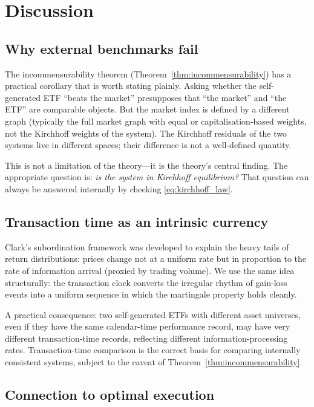 \documentclass[twocolumn,11pt,a4paper]{article}
\theoremstyle{plain}
\theoremstyle{definition}
\theoremstyle{remark}
\begin{document}
\section{Discussion}
\label{sec:discussion}

\subsection{Why external benchmarks fail}
\label{sec:discussion_benchmarks}

The incommensurability theorem (Theorem~\ref{thm:incommensurability})
has a practical corollary that is worth stating plainly.  Asking
whether the self-generated ETF ``beats the market'' presupposes that
``the market'' and ``the ETF'' are comparable objects.  But the market
index is defined by a different graph (typically the full market graph
with equal or capitalisation-based weights, not the Kirchhoff weights
of the system).  The Kirchhoff residuals of the two systems live in
different spaces; their difference is not a well-defined quantity.

This is not a limitation of the theory---it is the theory's central
finding.  The appropriate question is: \emph{is the system in
Kirchhoff equilibrium?}  That question can always be answered
internally by checking \eqref{eq:kirchhoff_law}.

\subsection{Transaction time as an intrinsic currency}
\label{sec:discussion_txtime}

Clark's subordination framework \cite{Clark1973} was developed to
explain the heavy tails of return distributions: prices change not
at a uniform rate but in proportion to the rate of information
arrival (proxied by trading volume).  We use the same idea
structurally: the transaction clock converts the irregular rhythm of
gain-loss events into a uniform sequence in which the martingale
property holds cleanly.

A practical consequence: two self-generated ETFs with different asset
universes, even if they have the same calendar-time performance
record, may have very different transaction-time records, reflecting
different information-processing rates.  Transaction-time comparison
is the correct basis for comparing internally consistent systems,
subject to the caveat of Theorem~\ref{thm:incommensurability}.

\subsection{Connection to optimal execution}
\label{sec:discussion_execution}
\end{document}
